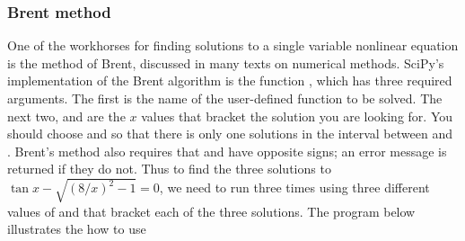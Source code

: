\documentclass[letterpaper,10pt,english]{sphinxmanual}
\begin{document}

\subsubsection{Brent method}
\label{chap9/chap9_scipy:brent-method}\label{chap9/chap9_scipy:index-12}
One of the workhorses for finding solutions to a single variable nonlinear equation is the method of Brent, discussed in many texts on numerical methods.  SciPy's implementation of the Brent algorithm is the function , which has three required arguments.  The first  is the name of the user-defined function to be solved.  The next two,  and  are the $x$ values that bracket the solution you are looking for.  You should choose  and  so that there is only one solutions in the interval between  and .  Brent's method also requires that  and  have opposite signs; an error message is returned if they do not.  Thus to find the three solutions to $\tan x - \sqrt{(8/x)^2-1} = 0$, we need to run  three times using three different values of  and  that bracket each of the three solutions.  The program below illustrates the how to use 
\end{document}
